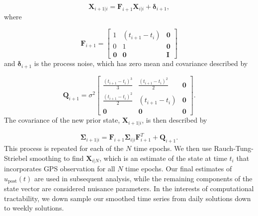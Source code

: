 \begin{equation}\label{predict}
  \mathbf{X}_{i+1|i} = \mathbf{F}_{i+1}\mathbf{X}_{i|i} + \mathbf{\delta}_{i+1}, 
\end{equation}
where 

\begin{equation}
  \mathbf{F}_{i+1} = 
  \left[
  \begin{array}{ccc}
    1           & (t_{i+1} - t_i) & \mathbf{0}\\
    0           & 1              & \mathbf{0}\\
    \mathbf{0}  & \mathbf{0}     & \mathbf{I}
  \end{array}
  \right]
\end{equation}
and $\mathbf{\delta}_{i+1}$ is the process noise, which has zero mean and covariance described by

\begin{equation}
  \mathbf{Q}_{i+1} = 
  \sigma^2 \left[
  \begin{array}{ccc}
  \frac{(t_{i+1} - t_i)^3}{3} & \frac{(t_{i+1} - t_{i})^2}{2} & \mathbf{0}\\
  \frac{(t_{i+1} - t_i)^2}{2} & (t_{i+1} - t_{i}) & \mathbf{0}\\ 
  \mathbf{0} & \mathbf{0} & \mathbf{0}
  \end{array}
  \right].
\end{equation}
The covariance of the new prior state, $\mathbf{X}_{i+1|i}$, is then described by

\begin{equation}
  \mathbf{\Sigma}_{i+1|i} = \mathbf{F}_{i+1}\mathbf{\Sigma}_{i|i}\mathbf{F}^T_{i+1} + \mathbf{Q}_{i+1}.
\end{equation}
This process is repeated for each of the $N$ time epochs.  We then use Rauch-Tung-Striebel smoothing \citep{Rauch1965} to find $\mathbf{X}_{i|N}$, which is an estimate of the state at time $t_i$ that incorporates GPS observation for all $N$ time epochs.  Our final estimates of $u_\mathrm{post}(t)$ are used in subsequent analysis, while the remaining components of the state vector are considered nuisance parameters. In the interests of computational tractability, we down sample our smoothed time series from daily solutions down to weekly solutions.

